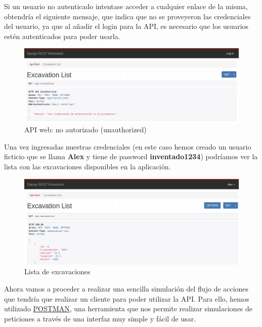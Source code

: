 Si un usuario no autenticado intentase acceder a cualquier enlace de la misma, obtendría el
siguiente mensaje, que indica que no se proveyeron las credenciales del usuario, ya que al
añadir el login para la API, es necesario que los usuarios estén autenticados para poder
usarla.

        \begin{figure}[H]
            \centering
            \includegraphics[scale=0.25]{imagenes/unauthorized.png}
            \caption{API web: no autorizado (unauthorized)}
            \label{fig:unauthorized}
        \end{figure}

Una vez ingresadas nuestras credenciales (en este caso hemos creado un usuario ficticio que
se llama \textbf{Alex} y tiene de password \textbf{inventado1234}) podríamos ver la lista
con las excavaciones disponibles en la aplicación.

        \begin{figure}[H]
            \centering
            \includegraphics[scale=0.30]{imagenes/list-excavations.png}
            \caption{Lista de excavaciones}
            \label{fig:list-excavations}
        \end{figure}

Ahora vamos a proceder a realizar una sencilla simulación del flujo de acciones que tendría
que realizar un cliente para poder utilizar la API. Para ello, hemos utilizado
\href{https://www.postman.com/}{POSTMAN}, una herramienta que nos permite realizar
simulaciones de peticiones a través de una interfaz muy simple y fácil de usar.\\

